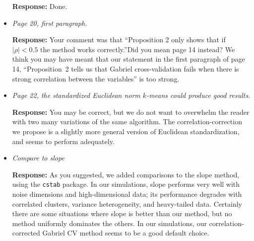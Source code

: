\documentclass[11pt]{article}
\begin{document}
\begin{itemize}
\textbf{Response:} Done.


\item \textit{Page 20, first paragraph.}

\textbf{Response:} Your comment was that ``Proposition 2 only shows that if
$|\rho|<0.5$ the method works correctly.''Did you mean page 14 instead?  We
think you may have meant that our statement in the first paragraph of  page
14, ``Proposition~2 tells us that Gabriel cross-validation fails when there is
strong correlation between the variables'' is too strong.


\item \textit{Page 22, the standardized Euclidean norm $k$-means could produce
good results.}

\textbf{Response:} You may be correct, but we do not want to overwhelm the
reader with two many variations of the same algorithm. The correlation-correction
we propose is a slightly more general version of Euclidean standardization,
and seems to perform adequately.



\item \textit{Compare to slope}

\textbf{Response:} As you suggested, we added comparisons to the slope method,
using the \texttt{cstab} package. In our simulations, slope performs very well
with noise dimensions and high-dimensional data; its performance degrades with
correlated clusters, variance heterogeneity, and heavy-tailed data. Certainly
there are some situations where slope is better than our method, but no method
uniformly dominates the others. In our simulations, our correlation-corrected
Gabriel CV method seems to be a good default choice.

% 
% 
% 
% 
% 

\end{itemize}
\end{document}
